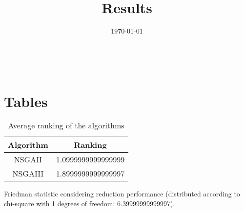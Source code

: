 \documentclass{article}
\title{Results}
\author{}
\date{\today}
\begin{document}
\oddsidemargin 0in \topmargin 0in\maketitle
\
\section{Tables}
\begin{table}[!htp]
\centering
\caption{Average ranking of the algorithms}
\begin{tabular}{c|c}
Algorithm&Ranking\\
\hline
NSGAII&1.0999999999999999\\
NSGAIII&1.8999999999999997\\
\end{tabular}
\end{table}


Friedman statistic considering reduction performance (distributed according to chi-square with 1 degrees of freedom: 6.39999999999997).
\end{document}
